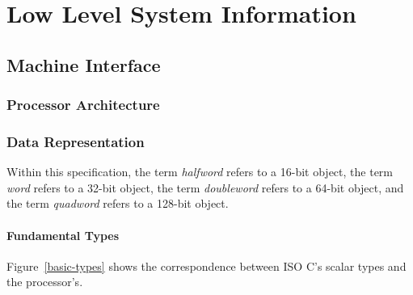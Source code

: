 \chapter{Low Level System Information}

\section{Machine Interface}

\subsection{Processor Architecture}

\subsection{Data Representation}

Within this specification, the term \emph{halfword} refers to a 16-bit
object, the term \emph{word} refers to a 32-bit object, the term
\emph{doubleword} refers to a 64-bit object, and the term
\emph{quadword} refers to a 128-bit object.

\subsubsection{Fundamental Types}

Figure~\ref{basic-types} shows the correspondence between ISO C's
scalar types and the processor's.

